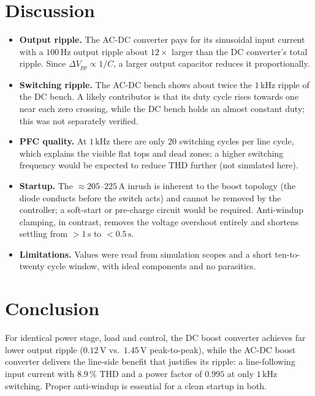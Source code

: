 \documentclass[11pt,a4paper]{article}
\begin{document}
\section{Discussion}
\begin{itemize}
\item \textbf{Output ripple.} The AC-DC converter pays for its sinusoidal input current with a
  $100\,\mathrm{Hz}$ output ripple about $12\times$ larger than the DC converter's total ripple.
  Since $\Delta V_{pp}\propto1/C$, a larger output capacitor reduces it proportionally.
\item \textbf{Switching ripple.} The AC-DC bench shows about twice the $1\,\mathrm{kHz}$ ripple of the
  DC bench. A likely contributor is that its duty cycle rises towards one near each zero crossing,
  while the DC bench holds an almost constant duty; this was not separately verified.
\item \textbf{PFC quality.} At $1\,\mathrm{kHz}$ there are only 20 switching cycles per line cycle,
  which explains the visible flat tops and dead zones; a higher switching frequency would be
  expected to reduce THD further (not simulated here).
\item \textbf{Startup.} The $\approx205$--$225\,\mathrm{A}$ inrush is inherent to the boost
  topology (the diode conducts before the switch acts) and cannot be removed by the controller; a
  soft-start or pre-charge circuit would be required. Anti-windup clamping, in contrast, removes
  the voltage overshoot entirely and shortens settling from $>1\,\mathrm{s}$ to $<0.5\,\mathrm{s}$.
\item \textbf{Limitations.} Values were read from simulation scopes and a short ten-to-twenty
  cycle window, with ideal components and no parasitics.
\end{itemize}

\section{Conclusion}
For identical power stage, load and control, the DC boost converter achieves far lower output
ripple ($0.12\,\mathrm{V}$ vs.\ $1.45\,\mathrm{V}$ peak-to-peak), while the AC-DC boost converter
delivers the line-side benefit that justifies its ripple: a line-following input current with
$8.9\,\%$ THD and a power factor of $0.995$ at only $1\,\mathrm{kHz}$ switching. Proper anti-windup
is essential for a clean startup in both.

\appendix
\end{document}
